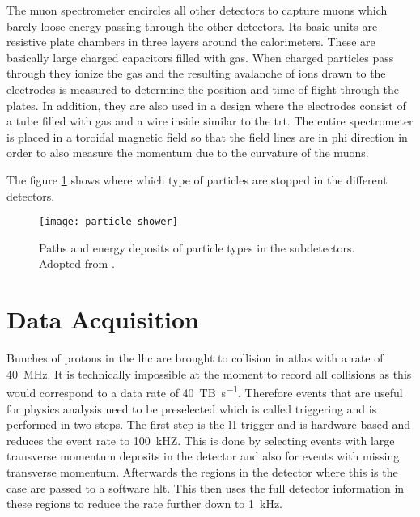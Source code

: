 The muon spectrometer encircles all other detectors to capture muons which barely loose energy passing through the other detectors. Its basic units are resistive plate chambers in three layers around the calorimeters. These are basically large charged capacitors filled with gas. When charged particles pass through they ionize the gas and the resulting avalanche of ions drawn to the electrodes is measured to determine the position and time of flight through the plates.  In addition, they are also used in a design where the electrodes consist of a tube filled with gas and a wire inside similar to the \ac{trt}. The entire spectrometer is placed in a toroidal magnetic field so that the field lines are in phi direction in order to also measure the momentum due to the curvature of the muons.

The figure \ref{fig:particles_in_detector} shows where which type of particles are stopped in the different detectors.
\begin{figure}
    \centering
    \texttt{[image: particle-shower]}
    \caption[]{Paths and energy deposits of particle types in the subdetectors. Adopted from \citep{Guth:2765038}.}
    \label{fig:particles_in_detector}
\end{figure}

\section{Data Acquisition}\label{sec:tdaq}
Bunches of protons in the \ac{lhc} are brought to collision in \ac{atlas} with a rate of \qty[]{40}{MHz}. It is technically impossible at the moment to record all collisions as this would correspond to a data rate of \qty[]{40}{TB\per s}. Therefore events that are useful for physics analysis need to be preselected which is called triggering and is performed in two steps. The first step is the \ac{l1} trigger and is hardware based and reduces the event rate to \qty[]{100}{kHZ}. This is done by selecting events with large transverse momentum deposits in the detector and also for events with missing transverse momentum. Afterwards the regions in the detector where this is the case are passed to a software \ac{hlt}. This then uses the full detector information in these regions to reduce the rate further down to \qty[]{1}{kHz}.
